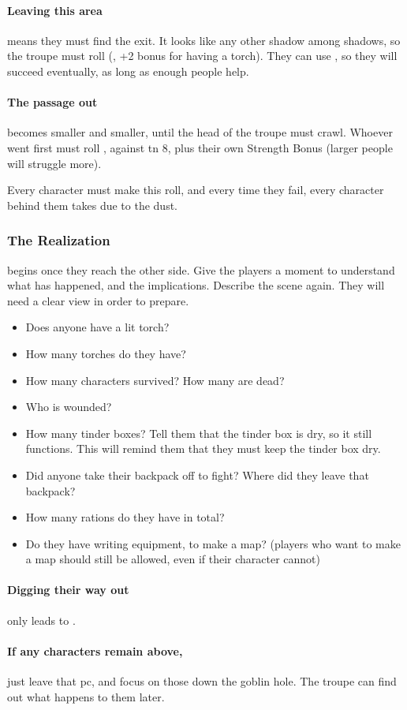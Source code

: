 \begin{multicols}{2}
\paragraph{Leaving this area}
means they must find the exit.
It looks like any other shadow among shadows, so the troupe must roll  (\tn[10], +2 bonus for having a torch).
They can use , so they will succeed eventually, as long as enough people help.

\paragraph{The passage out}
becomes smaller and smaller, until the head of the troupe must crawl.
Whoever went first must roll , against \gls{tn} 8, plus their own Strength Bonus (larger people will struggle more).

Every character must make this roll, and every time they fail, every character behind them takes  due to the dust.

\subsubsection{The Realization}
begins once they reach the other side.
Give the players a moment to understand what has happened, and the implications.
Describe the scene again.
They will need a clear view in order to prepare.

\begin{itemize}
  \item
  Does anyone have a lit torch?
  \item
  How many torches do they have?
  \item
  How many characters survived?
  How many are dead?
  \item
  Who is wounded?
  \item
  How many tinder boxes?
  Tell them that the tinder box is dry, so it still functions.
  This will remind them that they must keep the tinder box dry.
  \item
  Did anyone take their backpack off to fight?
  Where did they leave that backpack?
  \item
  How many \glspl{ration} do they have in total?
  \item
  Do they have writing equipment, to make a map?
  (players who want to make a map should still be allowed, even if their character cannot)
\end{itemize}

\paragraph{Digging their way out}
only leads to .

\paragraph{If any characters remain above,}
just leave that \gls{pc}, and focus on those down the goblin hole.
The troupe can find out what happens to them later.

\end{multicols}
